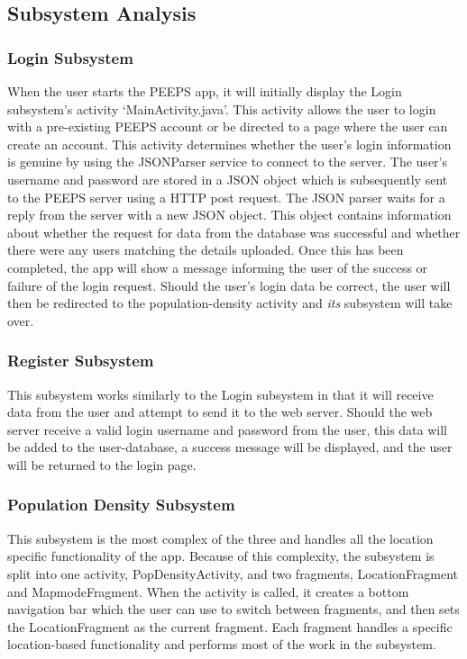 \subsection{Subsystem Analysis}
\label{sec:Subsystem Analysis}
\subsubsection{Login Subsystem}
When the user starts the PEEPS app, it will initially display the Login subsystem's activity `MainActivity.java'. This activity allows the user to login with a pre-existing PEEPS account or be directed to a page where the user can create an account. This activity determines whether the user's login information is genuine by using the JSONParser service to connect to the server. The user's username and password are stored in a JSON object which is subsequently sent to the PEEPS server using a HTTP post request. The JSON parser waits for a reply from the server with a new JSON object. This object contains information about whether the request for data from the database was successful and whether there were any users matching the details uploaded. Once this has been completed, the app will show a message informing the user of the success or failure of the login request. Should the user's login data be correct, the user will then be redirected to the population-density activity and \textit{its} subsystem will take over.

\subsubsection{Register Subsystem}
This subsystem works similarly to the Login subsystem in that it will receive data from the user and attempt to send it to the web server. Should the web server receive a valid login username and password from the user, this data will be added to the user-database, a success message will be displayed, and the user will be returned to the login page. 

\subsubsection{Population Density Subsystem}
This subsystem is the most complex of the three and handles all the location specific functionality of the app. Because of this complexity, the subsystem is split into one activity, PopDensityActivity, and two fragments, LocationFragment and MapmodeFragment. When the activity is called, it creates a bottom navigation bar which the user can use to switch between fragments, and then sets the LocationFragment as the current fragment. Each fragment handles a specific location-based functionality and performs most of the work in the subsystem. 

